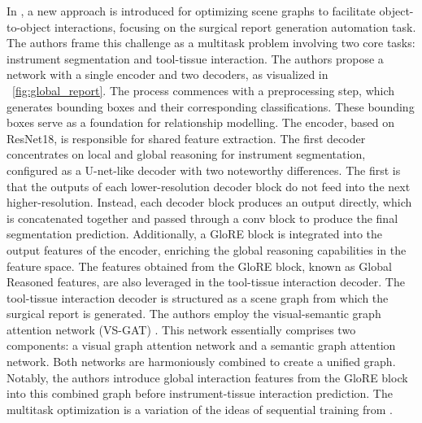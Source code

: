 \documentclass[times,twocolumn,final]{elsarticle}
\newcommand{\figref}[1]{\figurename~\ref{#1}}
\begin{document}
In \citet{seenivasan2022global}, a new approach is introduced for optimizing scene graphs to facilitate object-to-object interactions, focusing on the surgical report generation automation task. The authors frame this challenge as a multitask problem involving two core tasks: instrument segmentation and tool-tissue interaction. The authors propose a network with a single encoder and two decoders, as visualized in \figref{fig:global_report}.
The process commences with a preprocessing step, which generates bounding boxes and their corresponding classifications. These bounding boxes serve as a foundation for relationship modelling. The encoder, based on ResNet18, is responsible for shared feature extraction.
The first decoder concentrates on local and global reasoning for instrument segmentation, configured as a U-net-like decoder with two noteworthy differences. The first is that the outputs of each lower-resolution decoder block do not feed into the next higher-resolution. Instead, each decoder block produces an output directly, which is concatenated together and passed through a conv block to produce the final segmentation prediction.  Additionally, a GloRE block \citep{Chen_2019_CVPR} is integrated into the output features of the encoder, enriching the global reasoning capabilities in the feature space. The features obtained from the GloRE block, known as Global Reasoned features, are also leveraged in the tool-tissue interaction decoder.
The tool-tissue interaction decoder is structured as a scene graph from which the surgical report is generated. The authors employ the visual-semantic graph attention network (VS-GAT) \citep{9739429}. This network essentially comprises two components: a visual graph attention network and a semantic graph attention network. Both networks are harmoniously combined to create a unified graph. Notably, the authors introduce global interaction features from the GloRE block into this combined graph before instrument-tissue interaction prediction. The multitask optimization is a variation of the ideas of sequential training from \citet{learning_look_tracking}. 
\end{document}
